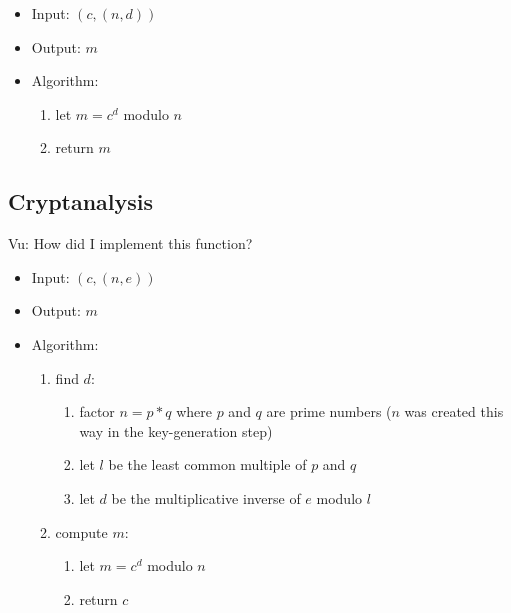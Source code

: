 \begin{itemize}
\item Input: $(c, (n, d))$
\item Output: $m$
\item Algorithm:
  \begin{enumerate}
  \item let $m = c^d$ modulo $n$
  \item return $m$
  \end{enumerate}
\end{itemize}


\subsection{Cryptanalysis}

Vu:
How did I implement this function?

\begin{itemize}
\item Input: $(c, (n, e))$
\item Output: $m$
\item Algorithm:
  \begin{enumerate}
  \item find $d$:
    \begin{enumerate}
    \item factor $n = p * q$ where
      $p$ and $q$ are prime numbers
      ($n$ was created this way in the key-generation step)
    \item let $l$ be the least common multiple of $p$ and $q$
    \item let $d$ be the multiplicative inverse of $e$
      modulo $l$
    \end{enumerate}
  \item compute $m$:
    \begin{enumerate}
    \item let $m = c^d$ modulo $n$
    \item return $c$
    \end{enumerate}
  \end{enumerate}
\end{itemize}
